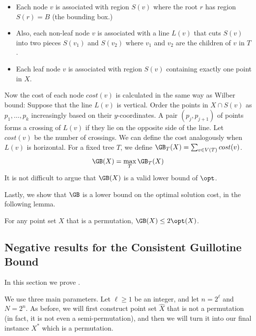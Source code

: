 \documentclass{toc}
\begin{document}
\begin{itemize}
\item Each node $v$ is associated with region $S(v)$ where the root $r$ has region $S(r) = B$ (the bounding box.) 

\item Also, each non-leaf node $v$ is associated with a line $L(v)$ that cuts $S(v)$ into two pieces $S(v_1)$ and $S(v_2)$ where $v_1$ and $v_2$ are the children of $v$ in $T$.

\item Each leaf node $v$ is associated with region $S(v)$ containing exactly one point in $X$.  
\end{itemize}  

Now the cost of each node $cost(v)$ is calculated in the same way as Wilber bound: Suppose that the line $L(v)$ is vertical. Order the points in $X \cap S(v)$ as $p_1, \ldots, p_k$ increasingly based on their $y$-coordinates. A pair $(p_j, p_{j+1})$ of points forms a crossing of $L(v)$ if they lie on the opposite side of the line.
Let $cost(v)$ be the number of crossings. 
We can define the cost analogously when $L(v)$ is horizontal. 
For a fixed tree $T$, we define $\GB_{T}(X) = \sum_{v \in V(T)} cost(v)$. 
\[ \GB(X) = \max_{T} \GB_{T}(X) \]  
It is not difficult to argue that $\GB(X)$ is a valid lower bound of $\opt$. 
\fi

Lastly, we show that $\GB$ is a lower bound on the optimal solution cost, in the following lemma. 

\begin{lemma}\label{lem: GB is lb for opt}
For any point set $X$ that is a permutation, $\GB(X) \leq 2 \opt(X)$.  
\end{lemma} 


%
%
%


%
%



%
%
%
%
\subsection{Negative results for the Consistent Guillotine Bound}\label{subsec: Instance construction for extended}
%
%
%
%
In this section we prove .

\newcommand{\EESBRS}{\mbox{\sf 2D-ES-BRS}}
We use three main parameters. Let $\ell\geq 1$ be an integer, and let $n = 2^{\ell}$ and $N= 2^n$.
As before, we will first construct point set $\hat{X}$ that is not a permutation (in fact, it is not even a semi-permutation), and then we will turn it into our final instance $X^*$ which is a permutation.  
%
\end{document}
